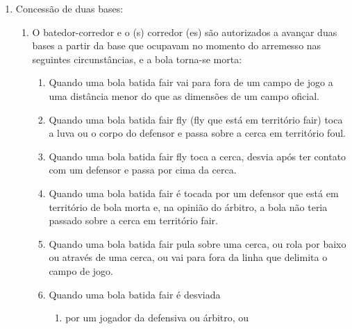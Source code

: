 \begin{multicols}{2}
\begin{enumerate}[label=\alph*)]
\begin{enumerate}[label=\roman*.]
\begin{enumerate}[label=\arabic*)]
			Se uma bola arremessada escapa do receptor, e este a recupera com equipamento fora do lugar apropriado quando nenhum corredor est\'a avan\c{c}ando, nenhuma poss\'ivel jogada \'e evidente, ou n\~ao ocasiona qualquer vantagem, n\~ao deve ser concedida uma base a nenhum corredor; a bola permanece viva, e o batedor pode avan\c{c}ar \`a primeira base somente quando obt\'em base por \glspl{ball} (\gls{base on balls}), ou quando \'e aplicada a Regra do Terceiro \gls{strike}; ele pode avan\c{c}ar al\'em da primeira base a seu pr\'oprio risco. 
		\end{enumerate}
	\end{enumerate}
	\item  Concess\~ao de duas bases: 
	\begin{enumerate}[label=\roman* -]
		\item O batedor-corredor e o (s) corredor (es) s\~ao autorizados a avan\c{c}ar duas bases a partir da base que ocupavam no momento do arremesso nas seguintes circunst\^ancias, e a bola torna-se morta: 
		\begin{enumerate}[label=\arabic*)]
			\item Quando uma bola batida \gls{fair} vai para fora de um campo de jogo a uma dist\^ancia menor do que as dimens\~oes de um campo oficial. 
			\item Quando uma bola batida \gls{fair fly} (\gls{fly} que est\'a em territ\'orio \gls{fair}) toca a luva ou o corpo do defensor e passa sobre a cerca em territ\'orio \gls{foul}. 
			\item Quando uma bola batida \gls{fair fly} toca a cerca, desvia ap\'os ter contato com um defensor e passa por cima da cerca. 
			\item Quando uma bola batida \gls{fair} \'e tocada por um defensor que est\'a em territ\'orio de bola morta e, na opini\~ao do \'arbitro, a bola n\~ao teria passado sobre a cerca em territ\'orio \gls{fair}. 
			\item Quando uma bola batida \gls{fair} pula sobre uma cerca, ou rola por baixo ou atrav\'es de uma cerca, ou vai para fora da linha que delimita o campo de jogo. 
			\item Quando uma bola batida \gls{fair} \'e desviada 
			
			
			\begin{enumerate}[label=\alph*)]
				\item por um jogador da defensiva ou \'arbitro, ou 
				

\end{enumerate}
\end{enumerate}
\end{enumerate}
\end{enumerate}
\end{multicols}

